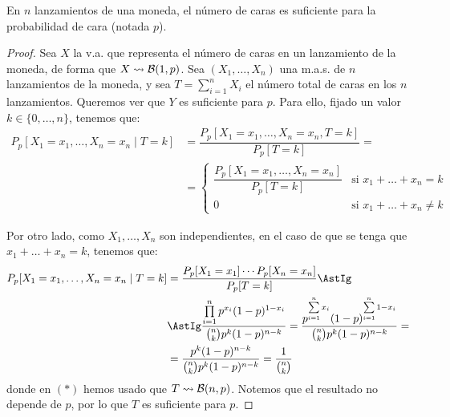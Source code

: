 \begin{ejemplo}
    En $n$ lanzamientos de una moneda, el número de caras es suficiente para la probabilidad de cara (notada $p$).
    \begin{proof}
        Sea $X$ la v.a. que representa el número de caras en un lanzamiento de la moneda, de forma que $X\rightsquigarrow \mathcal{B}(1,p)$. Sea $(X_1, \ldots, X_n)$ una m.a.s. de $n$ lanzamientos de la moneda, y sea $T = \sum\limits_{i=1}^n X_i$ el número total de caras en los $n$ lanzamientos. Queremos ver que $Y$ es suficiente para $p$. Para ello, fijado un valor $k\in\{0, \ldots, n\}$, tenemos que:
        \begin{align*}
            P_p[X_1=x_1, \ldots, X_n=x_n \mid T=k] &= \dfrac{P_p[X_1=x_1, \ldots, X_n=x_n, T=k]}{P_p[T=k]} =\\&= \begin{cases}
                \dfrac{P_p[X_1=x_1, \ldots, X_n=x_n]}{P_p[T=k]} & \text{si } x_1+\ldots+x_n=k \\
                0 & \text{si } x_1+\ldots+x_n\neq k
            \end{cases}
        \end{align*}

        Por otro lado, como $X_1, \ldots, X_n$ son independientes, en el caso de que se tenga que $x_1+\ldots+x_n=k$, tenemos que:
        \begin{align*}
            P_p[X_1=x_1, \ldots, X_n=x_n \mid T=k] &= \dfrac{P_p[X_1=x_1]\cdots P_p[X_n=x_n]}{P_p[T=k]}
            \AstIg\\&\AstIg \dfrac{\prod\limits_{i=1}^n p^{x_i}(1-p)^{1-x_i}}{\binom{n}{k}p^k(1-p)^{n-k}}
            = \dfrac{p^{\sum\limits_{i=1}^n x_i}(1-p)^{\sum\limits_{i=1}^n 1-x_i}}{\binom{n}{k}p^k(1-p)^{n-k}}
            =\\&= \dfrac{p^k(1-p)^{n-k}}{\binom{n}{k}p^k(1-p)^{n-k}} = \dfrac{1}{\binom{n}{k}}
        \end{align*}
        donde en $(\ast)$ hemos usado que $T\rightsquigarrow \mathcal{B}(n,p)$. Notemos que el resultado no depende de $p$, por lo que $T$ es suficiente para $p$.
    \end{proof}
\end{ejemplo}

